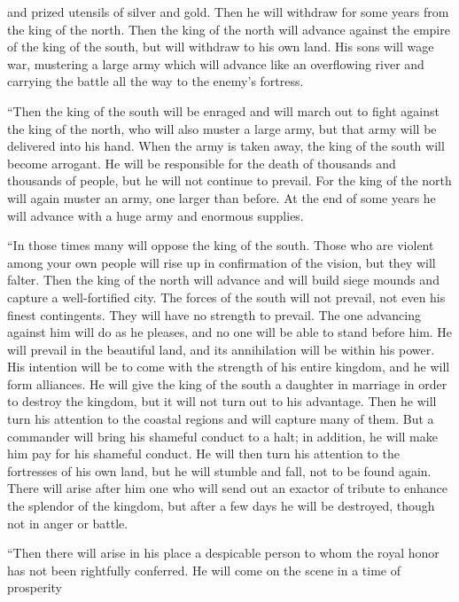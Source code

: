 {and prized
utensils
of silver
and gold.
Then he
will withdraw
for some years
from the king
of the north.
Then the king of the north will advance
against the empire
of the king
of the south,
but will withdraw
to
his own land.
His sons
will wage
war, mustering
a large
army
which will advance
like an overflowing
river and carrying the battle
all the way
to
the enemy’s
fortress.
\par }{\PP {}“Then the king
of the south
will be enraged
and will march out
to fight
against
the king
of the north,
who
will
also muster
a large
army, but that army will be delivered
into his hand.
When the army
is taken away, the king of the south will become arrogant. He will be responsible for the death of thousands and thousands
of people, but he will not continue to prevail.
For the king
of the north
will again
muster
an army, one larger
than
before.
At the end
of some years
he will advance
with a huge
army
and enormous
supplies.
\par }{\PP {}“In those
times
many
will oppose
the king
of the south.
Those who are violent
among your own people
will rise
up in confirmation
of the vision,
but they will falter.
Then the king
of the north
will advance
and will build
siege mounds
and capture
a well-fortified
city.
The forces
of the south
will not
prevail,
not even his finest
contingents.
They will have no
strength
to prevail.
The one advancing
against
him will do
as he pleases,
and no one
will be able to stand
before
him. He will prevail
in the beautiful
land,
and its annihilation will be within his power.
His intention
will be to come
with the strength
of his entire
kingdom,
and he will form alliances.
He will give
the king of the south a daughter
in marriage
in order to destroy
the kingdom, but it will not turn out to his advantage.
Then he will turn
his attention to the coastal
regions and will capture
many
of them. But a commander
will bring his shameful
conduct to a halt;
in addition, he will make him pay for his shameful
conduct.
He will then turn
his attention to the fortresses
of his own land,
but he will stumble
and fall,
not
to be found again.
There will arise after him one who will send out an exactor of tribute to enhance the splendor
of the kingdom,
but after a few days
he will be destroyed, though not
in anger
or
battle.
\par }{\PP {}“Then there will arise
in
his place
a despicable
person to whom the royal
honor has not
been rightfully
conferred.
He will come
on
the scene in a time of prosperity
}

